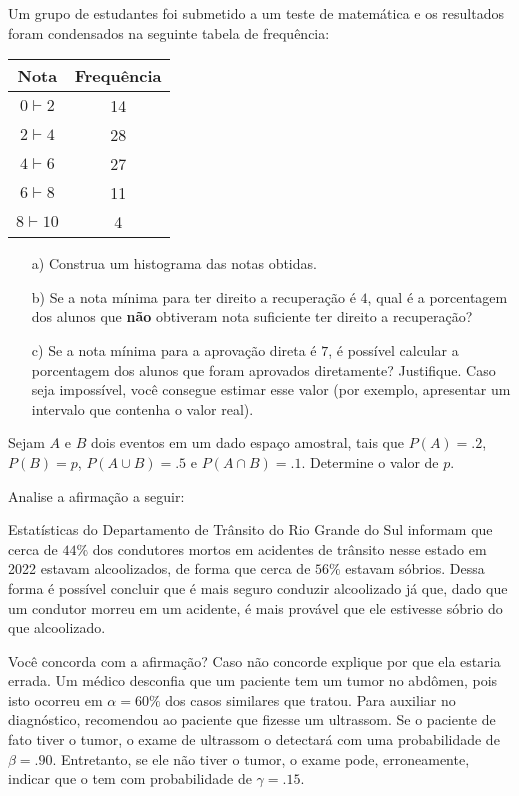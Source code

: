 \documentclass[11pt,addpoints,answers]{exam}
\begin{document}
\begin{questions}

  \question[20]
  Um grupo de estudantes foi submetido a um teste de matemática e os resultados foram
  condensados na seguinte tabela de frequência:
  \begin{table}[h]
    \centering
    \begin{tabular}{c|c}
      Nota & Frequência \\ \hline
      $0 \vdash 2$ & 14 \\
      $2 \vdash 4$ & 28 \\
      $4 \vdash 6$ & 27 \\
      $6 \vdash 8$ & 11 \\
      $8 \vdash 10$ & 4 \\
    \end{tabular}
  \end{table}
  \begin{itemize}
    \item[a)] Construa um histograma das notas obtidas.
    \item[b)] Se a nota mínima para ter direito a recuperação é $4$, qual
      é a porcentagem dos alunos que \textbf{não} obtiveram nota suficiente 
      ter direito a recuperação?
    \item[c)] Se a nota mínima para a aprovação direta é $7$, é possível calcular
      a porcentagem dos alunos que foram aprovados diretamente? Justifique. Caso seja impossível,
      você consegue estimar esse valor (por exemplo, apresentar um intervalo que contenha
      o valor real).
  \end{itemize}

  \question[15]
  Sejam $A$ e $B$ dois eventos em um dado espaço amostral,
  tais que $P(A) = .2$, $P(B) = p$, $P(A\cup B) = .5$ e $P(A \cap B) = .1$.
  Determine o valor de $p$.

  \question[15]
  Analise a afirmação a seguir:
  \begin{tcolorbox}
  Estatísticas do Departamento de Trânsito do Rio Grande do Sul informam que
  cerca de $44\%$ dos condutores mortos em acidentes de trânsito nesse estado
  em 2022 estavam alcoolizados, de forma que cerca de $56\%$ estavam sóbrios.
  Dessa forma é possível concluir que é mais seguro conduzir alcoolizado já
  que, dado que um condutor morreu em um acidente, é mais provável que ele
  estivesse sóbrio do que alcoolizado.

  \end{tcolorbox}
  Você concorda com a afirmação? Caso não concorde explique por que ela estaria
  errada.
  \question
  Um médico desconfia que um paciente tem um tumor no abdômen, pois isto
  ocorreu em $\alpha = 60\%$  dos casos similares que tratou. Para auxiliar
  no diagnóstico, 
  recomendou ao paciente que fizesse um ultrassom. Se o paciente de fato
  tiver o tumor, o exame de ultrassom o detectará com uma probabilidade
  de $\beta = .90$. Entretanto, se ele não tiver o tumor, o exame pode,  
  erroneamente, 
  indicar que o tem com probabilidade de $\gamma = .15$.  
  \begin{parts}

\end{parts}
\end{questions}
\end{document}
